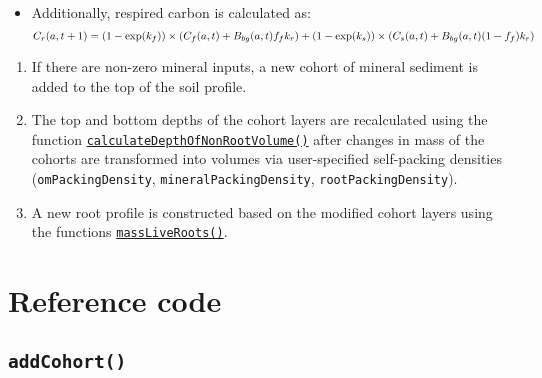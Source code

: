 \begin{itemize}
\tightlist
\item
  Additionally, respired carbon is calculated as:
  \[C_r(a,t+1) = (1 - \text{exp}(k_f))\times (C_f(a,t) + B_{bg}(a,t)f_f k_r) \\ 
    + (1 - \text{exp}(k_s))\times (C_s(a,t) + B_{bg}(a,t)(1-f_f) k_r)\]
\end{itemize}

\begin{enumerate}
\def\labelenumi{\arabic{enumi}.}
\setcounter{enumi}{1}
\tightlist
\item
  If there are non-zero mineral inputs, a new cohort of mineral sediment
  is added to the top of the soil profile.
\item
  The top and bottom depths of the cohort layers are recalculated using
  the function
  \protect\hyperlink{calculatedepthofnonrootvolume}{\texttt{calculateDepthOfNonRootVolume()}}
  after changes in mass of the cohorts are transformed into volumes via
  user-specified self-packing densities (\texttt{omPackingDensity},
  \texttt{mineralPackingDensity}, \texttt{rootPackingDensity}).
\item
  A new root profile is constructed based on the modified cohort layers
  using the functions
  \protect\hyperlink{massliveroots}{\texttt{massLiveRoots()}}.
\end{enumerate}

\pagebreak

\hypertarget{reference-code}{%
\section{Reference code}\label{reference-code}}

\hypertarget{addcohort}{%
\subsection{\texorpdfstring{\texttt{addCohort()}}{addCohort()}}\label{addcohort}}

